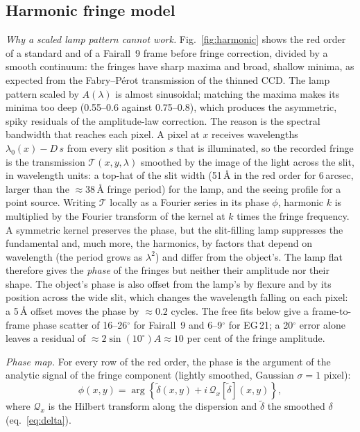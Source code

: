 \subsection{Harmonic fringe model}
\label{sec:fringe_harmonic}
\textit{Why a scaled lamp pattern cannot work.} Fig.~\ref{fig:harmonic} shows the red order of a standard and of a
Fairall~9 frame before fringe correction, divided by a smooth continuum: the fringes have sharp maxima and broad,
shallow minima, as expected from the Fabry--P\'erot transmission of the thinned CCD. The lamp pattern scaled by
$A(\lambda)$ is almost sinusoidal; matching the maxima makes its minima too deep (0.55--0.6 against 0.75--0.8), which
produces the asymmetric, spiky residuals of the amplitude-law correction. The reason is the spectral bandwidth that
reaches each pixel. A pixel at $x$ receives wavelengths $\lambda_0(x)-D\,s$ from every slit position $s$ that is
illuminated, so the recorded fringe is the transmission $\mathcal{T}(x,y,\lambda)$ smoothed by the image of the light
across the slit, in wavelength units: a top-hat of the slit width (51\,\AA{} in the red order for 6\,arcsec, larger than
the $\approx38$\,\AA{} fringe period) for the lamp, and the seeing profile for a point source. Writing
$\mathcal{T}$ locally as a Fourier series in its phase $\phi$, harmonic $k$ is multiplied by the Fourier transform of
the kernel at $k$ times the fringe frequency. A symmetric kernel preserves the phase, but the slit-filling lamp
suppresses the fundamental and, much more, the harmonics, by factors that depend on wavelength (the period grows as
$\lambda^2$) and differ from the object's. The lamp flat therefore gives the \emph{phase} of the fringes but neither
their amplitude nor their shape. The object's phase is also offset from the lamp's by flexure and by its position
across the wide slit, which changes the wavelength falling on each pixel: a 5\,\AA{} offset moves the phase by
$\approx0.2$ cycles. The free fits below give a frame-to-frame phase scatter of 16--26$^\circ$ for Fairall~9 and
6--9$^\circ$ for EG\,21; a 20$^\circ$ error alone leaves a residual of $\approx2\sin(10^\circ)A\approx10$ per cent of the
fringe amplitude.

\textit{Phase map.} For every row of the red order, the phase is the argument of the analytic signal of the fringe
component (lightly smoothed, Gaussian $\sigma=1$ pixel):
\begin{equation}
\phi(x,y)=\arg\left\{\tilde\delta(x,y)+i\,\mathcal{Q}_x[\tilde\delta](x,y)\right\},
\label{eq:phase}
\end{equation}
where $\mathcal{Q}_x$ is the Hilbert transform along the dispersion and $\tilde\delta$ the smoothed $\delta$ (eq.~\ref{eq:delta}).

